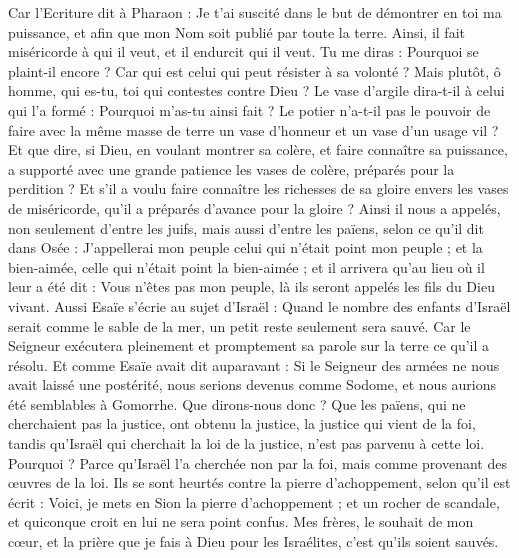 \begin{multicols}{2}
Car l'Ecriture dit à Pharaon : Je t'ai suscité dans le but de démontrer en toi ma puissance, et afin que mon Nom soit publié par toute la terre.
Ainsi, il fait miséricorde à qui il veut, et il endurcit qui il veut.
Tu me diras : Pourquoi se plaint-il encore ? Car qui est celui qui peut résister à sa volonté ?
Mais plutôt, ô homme, qui es-tu, toi qui contestes contre Dieu ? Le vase d’argile dira-t-il à celui qui l'a formé : Pourquoi m'as-tu ainsi fait ?
Le potier n'a-t-il pas le pouvoir de faire avec la même masse de terre un vase d’honneur et un vase d’un usage vil ?
Et que dire, si Dieu, en voulant montrer sa colère, et faire connaître sa puissance, a supporté avec une grande patience les vases de colère, préparés pour la perdition ?
Et s’il a voulu faire connaître les richesses de sa gloire envers les vases de miséricorde, qu'il a préparés d’avance pour la gloire ?
Ainsi il nous a appelés, non seulement d'entre les juifs, mais aussi d'entre les païens,
selon ce qu'il dit dans Osée : J'appellerai mon peuple celui qui n'était point mon peuple ; et la bien-aimée, celle qui n'était point la bien-aimée ;
et il arrivera qu'au lieu où il leur a été dit : Vous n’êtes pas mon peuple, là ils seront appelés les fils du Dieu vivant.
Aussi Esaïe s'écrie au sujet d'Israël : Quand le nombre des enfants d'Israël serait comme le sable de la mer, un petit reste seulement sera sauvé.
Car le Seigneur exécutera pleinement et promptement sa parole sur la terre ce qu’il a résolu.
Et comme Esaïe avait dit auparavant : Si le Seigneur des armées ne nous avait laissé une postérité, nous serions devenus comme Sodome, et nous aurions été semblables à Gomorrhe.
Que dirons-nous donc ? Que les païens, qui ne cherchaient pas la justice, ont obtenu la justice, la justice qui vient de la foi,
tandis qu’Israël qui cherchait la loi de la justice, n'est pas parvenu à cette loi.
Pourquoi ? Parce qu’Israël l’a cherchée non par la foi, mais comme provenant des œuvres de la loi. Ils se sont heurtés contre la pierre d'achoppement,
selon qu’il est écrit : Voici, je mets en Sion la pierre d'achoppement ; et un rocher de scandale, et quiconque croit en lui ne sera point confus.
\VerseOne{}Mes frères, le souhait de mon cœur, et la prière que je fais à Dieu pour les Israélites, c'est qu'ils soient sauvés.

\end{multicols}

